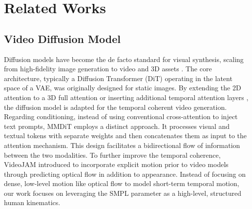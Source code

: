 \section{Related Works}

\subsection{Video Diffusion Model}
Diffusion models have become the de facto standard for visual synthesis, scaling from high-fidelity image generation \citep{rombach2022high, esser2024scaling, peebles2023scalable} to video \citep{blattmann2023stable, lin2024open, wan2025wan} and 3D assets \citep{long2024wonder3d, xiang2025structured, yang2025wonder3d++, liu2023syncdreamer, zhao2025hunyuan3d}. 
The core architecture, typically a Diffusion Transformer (DiT) \citep{peebles2023scalable} operating in the latent space of a VAE, was originally designed for static images.
By extending the 2D attention to a 3D full attention \citep{wan2025wan, kong2024hunyuanvideo} or inserting additional temporal attention layers \citep{blattmann2023stable, gao2025seedance}, the diffusion model is adapted for the temporal coherent video generation. 
Regarding conditioning, instead of using conventional cross-attention to inject text prompts, MMDiT \citep{esser2024scaling} employs a distinct approach. It processes visual and textual tokens with separate weights and then concatenates them as input to the attention mechanism. This design facilitates a bidirectional flow of information between the two modalities.
To further improve the temporal coherence, VideoJAM \citep{chefer2025videojam} introduced to incorporate explicit motion prior to video models through predicting optical flow in addition to appearance. 
Instead of focusing on dense, low-level motion like optical flow to model short-term temporal motion, our work focuses on leveraging the SMPL \citep{loper2023smpl} parameter as a high-level, structured human kinematics. 

